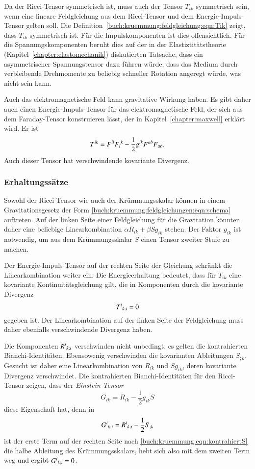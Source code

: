 Da der Ricci-Tensor symmetrisch ist, muss auch der Tensor $T_{ik}$
symmetrisch sein, wenn eine lineare Feldgleichung aus dem Ricci-Tensor
und dem Energie-Impuls-Tensor gelten soll.
Die Definition~\eqref{buch:kruemmung:feldgleichung:eqn:Tik} zeigt,
dass $T_{ik}$ symmetrisch ist.
Für die Impulskomponenten ist dies offensichtlich.
Für die Spannungskomponenten beruht dies auf der in der
Elastiztitätstheorie (Kapitel~\ref{chapter:elastomechanik})
diskutierten Tatsache, dass ein asymmetrischer Spannungstensor dazu
führen würde, dass das Medium durch verbleibende Drehmomente zu
beliebig schneller Rotation angeregt würde, was nicht sein kann.

Auch das elektromagnetische Feld kann gravitative Wirkung haben.
Es gibt daher auch einen Energie-Impuls-Tensor für das elektromagnetische
Feld, der sich aus dem Faraday-Tensor konstruieren lässt, der in
Kapitel~\ref{chapter:maxwell} erklärt wird.
Er ist
\[
T^{ik}
=
F^{il}F_l\mathstrut^k - \frac12 g^{ik}F^{ab}F_{ab}.
\]
Auch dieser Tensor hat verschwindende kovariante Divergenz.

%
%
\subsubsection{Erhaltungssätze}
Sowohl der Ricci-Tensor wie auch der Krümmungsskalar können in einem
Gravitationsgesetz der Form \eqref{buch:kruemmung:feldgleichungen:eqn:schema}
auftreten.
Auf der linken Seite einer Feldgleichung für die Gravitation könnten daher
eine beliebige Linearkombination $\alpha R_{ik}+\beta Sg_{ik}$ stehen.
Der Faktor $g_{ik}$ ist notwendig, um aus dem Krümmungsskalar $S$ einen
Tensor zweiter Stufe zu machen.

Der Energie-Impuls-Tensor auf der rechten Seite der Gleichung schränkt
die Linearkombination weiter ein.
Die Energieerhaltung bedeutet, dass für $T_{ik}$ eine kovariante 
Kontinuitätsgleichung gilt, die in Komponenten durch die kovariante
Divergenz
\[
T^i\mathstrut_{k;i}
=
0
\]
gegeben ist.
Der Linearkombination auf der linken Seite der Feldgleichung muss daher
ebenfalls verschwindende Divergenz haben.

Die Komponenten $R^i\mathstrut_{k;i}$ verschwinden nicht unbedingt,
es gelten die kontrahierten Bianchi-Identitäten.
Ebensowenig verschwinden die kovarianten Ableitungen $S_{;k}$.
Gesucht ist daher eine Linearkombination von $R_{ik}$ und $Sg_{ik}$,
deren kovariante Divergenz verschwindet.
Die kontrahierten Bianchi-Identitäten für den Ricci-Tensor zeigen, dass  der
\emph{Einstein-Tensor}
%
\[
G_{ik}
=
R_{ik}
-\frac12 g_{ik}S
\]
diese Eigenschaft hat, denn in
\[
G^i\mathstrut_{k;i}
=
R^i\mathstrut_{k;i}
-
\frac12 S_{;k}
\]
ist der erste Term auf der rechten Seite
nach \eqref{buch:kruemmung:eqn:kontrahiertS}
die halbe Ableitung des Krümmungsskalars, hebt sich also mit dem
zweiten Term weg und ergibt $G^i\mathstrut_{k;i}=0$.

